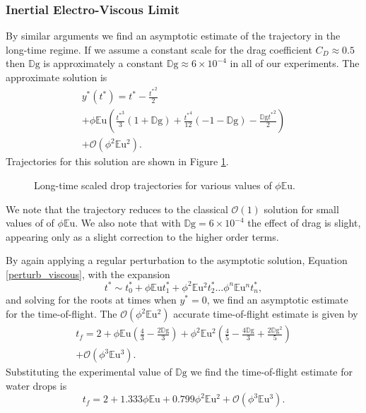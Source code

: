 \documentclass[aip,reprint, floatfix]{revtex4-1}
\begin{document}
\subsubsection{Inertial Electro-Viscous Limit}
By similar arguments we find an asymptotic estimate of the trajectory in the long-time regime. If we assume a constant scale for the drag coefficient $C_D \approx 0.5$ then $\mathbb{D}\mbox{g}$ is approximately a constant $\mathbb{D}\mbox{g} \approx 6 \times 10^{-4}$ in all of our experiments. The approximate solution is 
\begin{gather}
{y^*}({t^*}) = {t^*} - \frac{{t^*}^{2}}{2}  \nonumber \\
+ \phi\mathbb{E}\mbox{u} \left(\frac{{t^*}^{3}}{3} \left(1 + \mathbb{D}\mbox{g}\right) + \frac{{t^*}^{4}}{12} \left(-1 - \mathbb{D}\mbox{g}\right) - \frac{\mathbb{D}\mbox{g} {t^*}^{2}}{2}\right) \nonumber \\
 + \mathcal{O}(\phi^2 \mathbb{E}\mbox{u}^2).
\label{perturb_viscous}
\end{gather}
Trajectories for this solution are shown in Figure \ref{fig:long_times}.
\begin{figure}[htb]
    \centering
    \resizebox{0.5\textwidth}{!}{}
    \caption{Long-time scaled drop trajectories for various values of $\phi \mathbb{E}\mbox{u}$.}
     \label{fig:long_times}
\end{figure}
We note that the trajectory reduces to the classical $\mathcal{O}(1)$ solution for small values of of $\phi \mathbb{E}\mbox{u}$. We also note that with $\mathbb{D}\mbox{g} = 6 \times 10^{-4}$ the effect of drag is slight, appearing only as a slight correction to the higher order terms.
 
By again applying a regular perturbation to the asymptotic solution, Equation \ref{perturb_viscous}, with the expansion
\[ t^* \sim t^*_0 + \phi \mathbb{E}\mbox{u} t^*_1 + \phi^2 \mathbb{E}\mbox{u}^2 t^*_2 \ldots \phi^n \mathbb{E}\mbox{u}^n t^*_n  
,\]
and solving for the roots at times when $y^* = 0$, we find an asymptotic estimate for the time-of-flight. The $\mathcal{O}(\phi^2 \mathbb{E}\mbox{u}^2)$ accurate time-of-flight estimate is given by
\begin{gather*}
t_f = 2 + \phi \mathbb{E}\mbox{u} \left(\frac{4}{3} - \frac{2 \mathbb{D}\mbox{g}}{3}\right) 
+ \phi^2 \mathbb{E}\mbox{u}^{2} \left(\frac{4}{5} - \frac{4 \mathbb{D}\mbox{g}}{3} + \frac{2 \mathbb{D}\mbox{g}^{2}}{5}\right) \\
+ \mathcal{O}(\phi^3 \mathbb{E}\mbox{u}^3).
\end{gather*}
Substituting the experimental value of $\mathbb{D}\mbox{g}$ we find the time-of-flight estimate for water drops is
\begin{equation} \label{time_of_flight}
t_f = 2 + 1.333 \phi \mathbb{E}\mbox{u} + 0.799 \phi^2 \mathbb{E}\mbox{u}^{2} + \mathcal{O}(\phi^3 \mathbb{E}\mbox{u}^3). 
\end{equation} 
\end{document}
